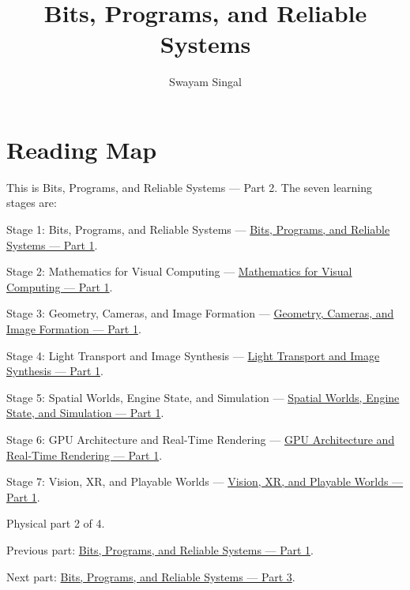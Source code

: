 \documentclass[11pt,twoside,openany]{book}
\title{Bits, Programs, and Reliable Systems}
\author{Swayam Singal}
\begin{document}
\maketitle
\begin{center}\end{center}
\chapter*{Reading Map}
\hypertarget{volume-reading-map}{}
\noindent This is Bits, Programs, and Reliable Systems --- Part 2. The seven learning stages are:
\par\noindent Stage 1: Bits, Programs, and Reliable Systems --- \href{../01-Bits-Programs-and-Reliable-Systems-P01/main.pdf}{Bits, Programs, and Reliable Systems — Part 1}.
\par\noindent Stage 2: Mathematics for Visual Computing --- \href{../02-Mathematics-for-Visual-Computing-P01/main.pdf}{Mathematics for Visual Computing — Part 1}.
\par\noindent Stage 3: Geometry, Cameras, and Image Formation --- \href{../03-Geometry-Cameras-and-Image-Formation-P01/main.pdf}{Geometry, Cameras, and Image Formation — Part 1}.
\par\noindent Stage 4: Light Transport and Image Synthesis --- \href{../04-Light-Transport-and-Image-Synthesis-P01/main.pdf}{Light Transport and Image Synthesis — Part 1}.
\par\noindent Stage 5: Spatial Worlds, Engine State, and Simulation --- \href{../05-Spatial-Worlds-Engine-State-and-Simulation-P01/main.pdf}{Spatial Worlds, Engine State, and Simulation — Part 1}.
\par\noindent Stage 6: GPU Architecture and Real-Time Rendering --- \href{../06-GPU-Architecture-and-Real-Time-Rendering-P01/main.pdf}{GPU Architecture and Real-Time Rendering — Part 1}.
\par\noindent Stage 7: Vision, XR, and Playable Worlds --- \href{../07-Vision-XR-and-Playable-Worlds-P01/main.pdf}{Vision, XR, and Playable Worlds — Part 1}.
\par\noindent Physical part 2 of 4.
\par\noindent Previous part: \href{../01-Bits-Programs-and-Reliable-Systems-P01/main.pdf}{Bits, Programs, and Reliable Systems — Part 1}.
\par\noindent Next part: \href{../01-Bits-Programs-and-Reliable-Systems-P03/main.pdf}{Bits, Programs, and Reliable Systems — Part 3}.
\tableofcontents
\mainmatter
\setcounter{chapter}{1}


\label{stagechaptersend:01-Bits-Programs-and-Reliable-Systems}
\appendix
\end{document}
